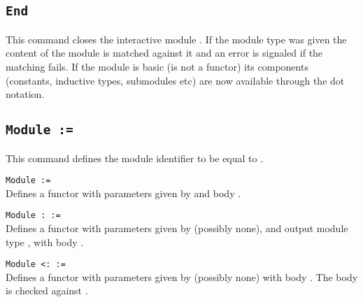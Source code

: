 \subsection{\tt End {\ident}}
This command closes the interactive module {\ident}. If the module type
was given the content of the module is matched against it and an error
is signaled if the matching fails. If the module is basic (is not a
functor) its components (constants, inductive types, submodules etc) are
now available through the dot notation.

\begin{ErrMsgs}
\item {}
\item {}
\item {}
\end{ErrMsgs}


\subsection{\tt Module {\ident} := {\modexpr}}
This command defines the module identifier {\ident} to be equal to {\modexpr}.

\begin{Variants}
\item{\tt Module {\ident} {\modbindings} := {\modexpr}}\\
 Defines a functor with parameters given by {\modbindings} and body {\modexpr}.
\item{\tt Module {\ident} {\modbindings} \verb.:. {\modtype} := {\modexpr}}\\
  Defines a functor with parameters given by {\modbindings} (possibly none),
  and output module type {\modtype}, with body {\modexpr}. 
\item{\tt Module {\ident} {\modbindings} \verb.<:. {\modtype} := {\modexpr}}\\
  Defines a functor with parameters given by {\modbindings} (possibly none) 
  with body {\modexpr}. The body is checked against {\modtype}.
\end{Variants}

